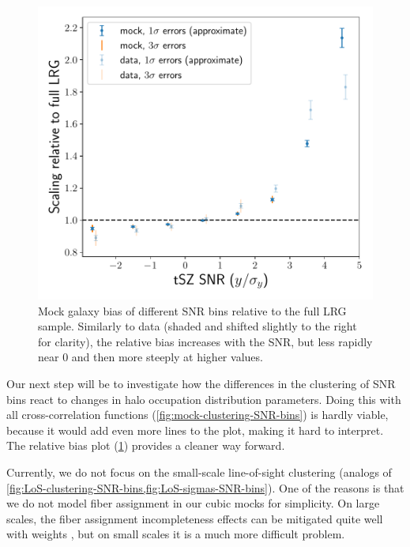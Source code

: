\begin{figure}[htbp]
    \centering
    \includegraphics[width=\textwidth]{fig/LRG-cubic-SZ-ACTPlanck-filtered2.4-monopole-jack-errorbars-relbias-with-data.pdf}
    \caption[Mock galaxy bias of different SNR bins relative to the full LRG sample]{Mock galaxy bias of different SNR bins relative to the full LRG sample.
    Similarly to data (shaded and shifted slightly to the right for clarity), the relative bias increases with the SNR, but less rapidly near 0 and then more steeply at higher values.}
    \label{fig:mock-relbias-SNR-bins}
\end{figure}

Our next step will be to investigate how the differences in the clustering of SNR bins react to changes in halo occupation distribution parameters.
Doing this with all cross-correlation functions (\cref{fig:mock-clustering-SNR-bins}) is hardly viable, because it would add even more lines to the plot, making it hard to interpret.
The relative bias plot (\cref{fig:mock-relbias-SNR-bins}) provides a cleaner way forward.

Currently, we do not focus on the small-scale line-of-sight clustering (analogs of \cref{fig:LoS-clustering-SNR-bins,fig:LoS-sigmas-SNR-bins}).
One of the reasons is that we do not model fiber assignment in our cubic mocks for simplicity.
On large scales, the fiber assignment incompleteness effects can be mitigated quite well with weights \citep{KP3s6-Bianchi,DESI2024.II.KP3}, but on small scales it is a much more difficult problem.

